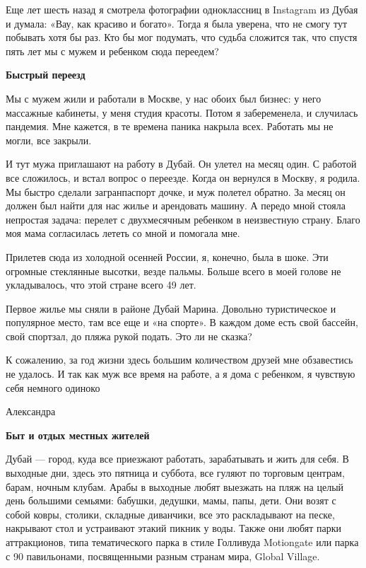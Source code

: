 Еще лет шесть назад я смотрела фотографии одноклассниц в Instagram из Дубая и думала: «Вау, как красиво и богато». Тогда я была уверена, что не смогу тут побывать хотя бы раз. Кто бы мог подумать, что судьба сложится так, что спустя пять лет мы с мужем и ребенком сюда переедем?

\textbf{Быстрый переезд}

Мы с мужем жили и работали в Москве, у нас обоих был бизнес: у него массажные кабинеты, у меня студия красоты. Потом я забеременела, и случилась пандемия. Мне кажется, в те времена паника накрыла всех. Работать мы не могли, все закрыли.

И тут мужа приглашают на работу в Дубай. Он улетел на месяц один. С работой все сложилось, и встал вопрос о переезде. Когда он вернулся в Москву, я родила. Мы быстро сделали загранпаспорт дочке, и муж полетел обратно. За месяц он должен был найти для нас жилье и арендовать машину. А передо мной стояла непростая задача: перелет с двухмесячным ребенком в неизвестную страну. Благо моя мама согласилась лететь со мной и помогала мне.

Прилетев сюда из холодной осенней России, я, конечно, была в шоке. Эти огромные стеклянные высотки, везде пальмы. Больше всего в моей голове не укладывалось, что этой стране всего 49 лет.

Первое жилье мы сняли в районе Дубай Марина. Довольно туристическое и популярное место, там все еще и «на спорте». В каждом доме есть свой бассейн, свой спортзал, до пляжа рукой подать. Это ли не сказка?

\begin{fancyquotes}
    К сожалению, за год жизни здесь большим количеством друзей мне обзавестись не удалось. И так как муж все время на работе, а я дома с ребенком, я чувствую себя немного одиноко

    \begin{flushright}
        Александра
    \end{flushright}
\end{fancyquotes}

\textbf{Быт и отдых местных жителей}

Дубай — город, куда все приезжают работать, зарабатывать и жить для себя. В выходные дни, здесь это пятница и суббота, все гуляют по торговым центрам, барам, ночным клубам. Арабы в выходные любят выезжать на пляж на целый день большими семьями: бабушки, дедушки, мамы, папы, дети. Они возят с собой ковры, столики, складные диванчики, все это раскладывают на песке, накрывают стол и устраивают этакий пикник у воды. Также они любят парки аттракционов, типа тематического парка в стиле Голливуда Motiongate или парка с 90 павильонами, посвященными разным странам мира, Global Village.

